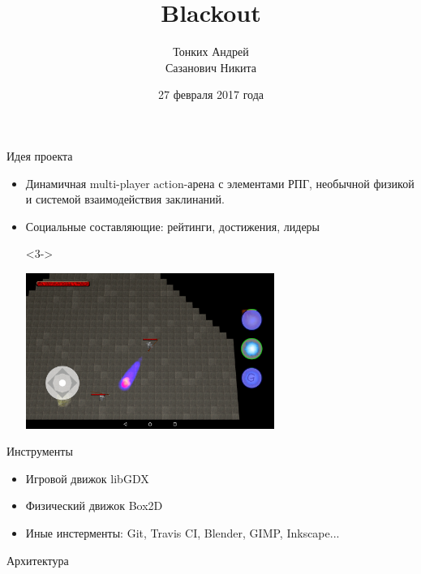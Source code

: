 \documentclass[12pt]{beamer}
\begin{document}
\title{Blackout}

\author[]{
    Тонких Андрей \\
    Сазанович Никита \\
}
\date{27 февраля 2017 года}

\frame{\titlepage}


\begin{frame}{Идея проекта}
    \begin{itemize}
        \item <1-> Динамичная multi-player action-арена с элементами РПГ, необычной физикой и системой взаимодействия заклинаний.
	      \item <2-> Социальные составляющие: рейтинги, достижения, лидеры
        \item[] <3-> \begin{center} \includegraphics[width=230pt]{screenshot.png} \end{center}
    \end{itemize}
\end{frame}


\begin{frame} {Инструменты}
    \begin{itemize}
        \item Игровой движок libGDX
        \item Физический движок Box2D
        \item Иные инстерменты: Git, Travis CI, Blender, GIMP, Inkscape...
    \end{itemize}
\end{frame}



\begin{frame} {Архитектура}
\noindent{}
\end{frame}
\end{document}
